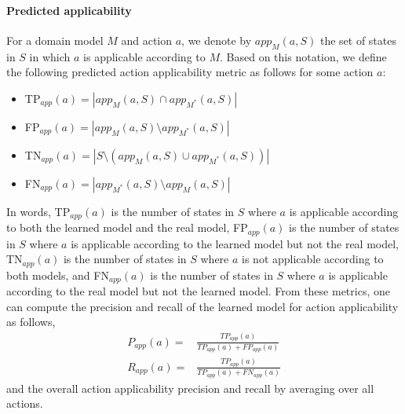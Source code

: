 \documentclass{article}
\theoremstyle{definition}
\theoremstyle{remark}
\newcommand{\realm}{\ensuremath{M^*}\xspace}
\newcommand{\app}{\ensuremath{\textit{app}}\xspace}
\begin{document}
\paragraph{Predicted applicability}
For a domain model $M$ and action $a$, we denote by $\app_M(a,S)$ the set of states in $S$ in which $a$ is applicable according to $M$. Based on this notation, we define the following predicted action applicability metric as follows for some action $a$:
\begin{itemize}
    \item TP$_{\app}(a)=|\app_M(a,S)\cap \app_\realm(a,S)|$
    \item FP$_{\app}(a)=|\app_M(a,S)\setminus \app_\realm(a,S)|$ 
    \item TN$_{\app}(a)=|S\setminus (\app_M(a,S)\cup \app_\realm(a,S))|$
    \item FN$_{\app}(a)=|\app_\realm(a,S)\setminus \app_M(a,S)|$
\end{itemize}
In words, TP$_{\app}(a)$ is the number of states in $S$ where $a$ is applicable according to both the learned model and the real model, FP$_{\app}(a)$ is the number of states in $S$ where $a$ is applicable according to the learned model but not the real model, TN$_{\app}(a)$ is the number of states in $S$ where $a$ is not applicable according to both models, and FN$_{\app}(a)$ is the number of states in $S$ where $a$ is applicable according to the real model but not the learned model. 
From these metrics, one can compute the precision and recall of the learned model for action applicability as follows,
\begin{align}
    P_{\app}(a)= & \frac{TP_{\app}(a)}{TP_{\app}(a)+FP_{\app}(a)}\\
    R_{\app}(a)= & \frac{TP_{\app}(a)}{TP_{\app}(a)+FN_{\app}(a)}    
\end{align} 
and the overall action applicability precision and recall
by averaging over all actions.  
\end{document}
